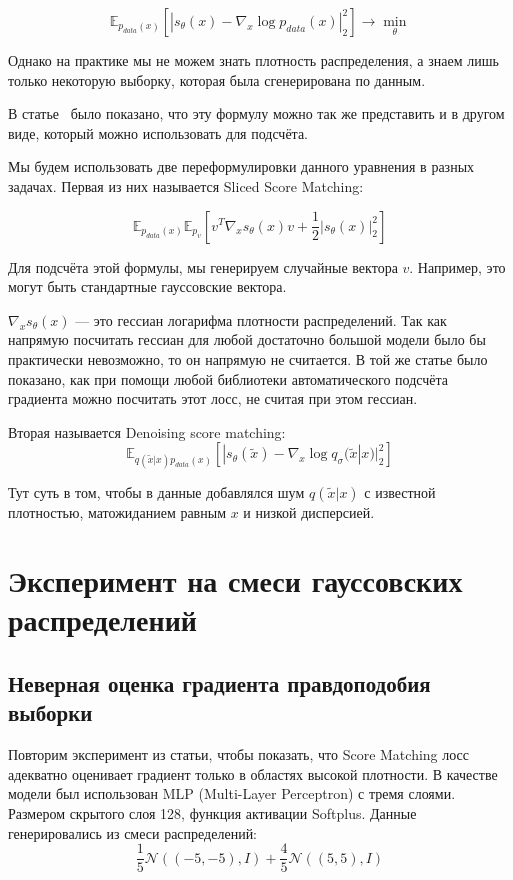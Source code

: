 \documentclass{article}
\begin{document}
\[
\mathbb{E}_{p_{data}(x)} \left[ | s_{\theta}(x) - \nabla_x \log p_{data}(x) |_2^2 \right] \to \min_{\theta}
\]

Однако на практике мы не можем знать плотность распределения, а знаем лишь
только некоторую выборку, которая была сгенерирована по данным.

В статье~\cite{sliced_score_matching} было показано, что эту формулу можно так
же представить и в другом виде, который можно использовать для подсчёта.

Мы будем использовать две переформулировки данного уравнения в разных задачах.
Первая из них называется Sliced Score Matching: 

\begin{equation}
    \mathbb{E}_{p_{data}(x)} \mathbb{E}_{p_v} \left[ v^T \nabla_x s_{\theta}(x) v + \frac{1}{2} |s_{\theta}(x)|_2^2 \right]
    \label{eq:sliced_score_matching}
\end{equation}

Для подсчёта этой формулы, мы генерируем случайные вектора $v$. Например, это могут быть стандартные
гауссовские вектора.

$\nabla_x s_{\theta}(x)$ --- это гессиан логарифма плотности распределений. Так как напрямую
посчитать гессиан для любой достаточно большой модели было бы практически невозможно, то
он напрямую не считается. В той же статье было показано, как при помощи любой библиотеки автоматического
подсчёта градиента можно посчитать этот лосс, не считая при этом гессиан.

Вторая называется Denoising score matching:
\begin{equation}
    \mathbb{E}_{q(\tilde{x} | x)p_{data}(x)} \left[ |s_{\theta}(\tilde{x}) - \nabla_x \log q_{\sigma}(\tilde{x} | x)|_2^2 \right]
    \label{eq:denoising_score_matching}
\end{equation}

Тут суть в том, чтобы в данные добавлялся шум $q(\tilde{x} | x)$ с известной
плотностью, матожиданием равным $x$ и низкой дисперсией.


\section{Эксперимент на смеси гауссовских распределений}

\subsection{Неверная оценка градиента правдоподобия выборки}
Повторим эксперимент из статьи, чтобы показать, что Score Matching лосс адекватно
оценивает градиент только в областях высокой плотности. В качестве модели был
использован MLP (Multi-Layer Perceptron) с тремя слоями. Размером скрытого слоя
128, функция активации Softplus. Данные генерировались из смеси распределений:
\[
\frac{1}{5} \mathcal{N}\left( \left( -5, -5\right), I \right)+\frac{4}{5} \mathcal{N}\left( \left( 5, 5\right), I \right)
\]
\end{document}

